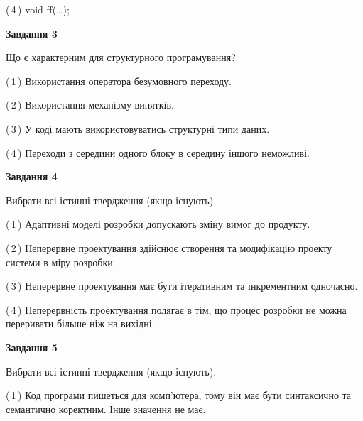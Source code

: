 \documentclass[10pt, ukrainian]{article}
\begin{document}
{\begin {large}
(\,4\,) void ff(…);%


{\begin {center}\textbf{Завдання 3}\end {center}}\par
Що є характерним для структурного програмування?\par
\vspace{2mm}



(\,1\,) Використання оператора безумовного переходу. %



(\,2\,) Використання механізму винятків. %



(\,3\,) У коді мають використовуватись структурні типи даних. %



(\,4\,) Переходи з середини одного блоку в середину іншого неможливі. %


{\begin {center}\textbf{Завдання 4}\end {center}}\par
Вибрати всі істинні твердження (якщо існують).\par
\vspace{2mm}



(\,1\,) Адаптивні моделі розробки допускають зміну вимог до продукту. %



(\,2\,) Неперервне проектування здійснює створення та модифікацію проекту системи в міру розробки. %



(\,3\,) Неперервне проектування має бути ітеративним та інкрементним одночасно. %



(\,4\,) Неперервність проектування полягає в тім, що процес розробки не можна переривати більше ніж на вихідні. %


{\begin {center}\textbf{Завдання 5}\end {center}}\par
Вибрати всі істинні твердження (якщо існують).\par
\vspace{2mm}



(\,1\,) Код програми пишеться для комп'ютера, тому він має бути синтаксично та семантично коректним. Інше значення не має. %




\end{large}}
\end{document}
